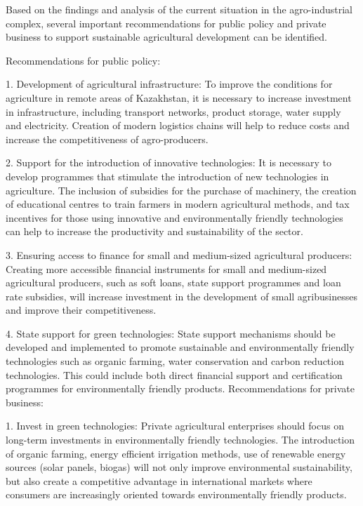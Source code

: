 \begin{multicols}{2}
Based on the findings and analysis of the current situation in the
agro-industrial complex, several important recommendations for public
policy and private business to support sustainable agricultural
development can be identified.

Recommendations for public policy:

1. Development of agricultural infrastructure: To improve the conditions
for agriculture in remote areas of Kazakhstan, it is necessary to
increase investment in infrastructure, including transport networks,
product storage, water supply and electricity. Creation of modern
logistics chains will help to reduce costs and increase the
competitiveness of agro-producers.

2. Support for the introduction of innovative technologies: It is
necessary to develop programmes that stimulate the introduction of new
technologies in agriculture. The inclusion of subsidies for the purchase
of machinery, the creation of educational centres to train farmers in
modern agricultural methods, and tax incentives for those using
innovative and environmentally friendly technologies can help to
increase the productivity and sustainability of the sector.

3. Ensuring access to finance for small and medium-sized agricultural
producers: Creating more accessible financial instruments for small and
medium-sized agricultural producers, such as soft loans, state support
programmes and loan rate subsidies, will increase investment in the
development of small agribusinesses and improve their competitiveness.

4. State support for green technologies: State support mechanisms should
be developed and implemented to promote sustainable and environmentally
friendly technologies such as organic farming, water conservation and
carbon reduction technologies. This could include both direct financial
support and certification programmes for environmentally friendly
products. Recommendations for private business:

1. Invest in green technologies: Private agricultural enterprises should
focus on long-term investments in environmentally friendly technologies.
The introduction of organic farming, energy efficient irrigation
methods, use of renewable energy sources (solar panels, biogas) will not
only improve environmental sustainability, but also create a competitive
advantage in international markets where consumers are increasingly
oriented towards environmentally friendly products.


\end{multicols}
